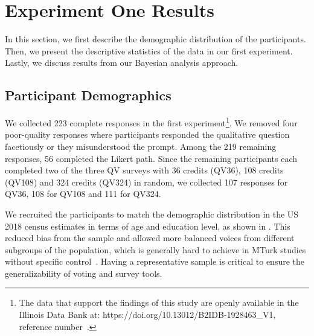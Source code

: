 \section{Experiment One Results} \label{results-1-quan}
In this section, we first describe the demographic distribution of the participants. Then, we present the descriptive statistics of the data in our first experiment. Lastly, we discuss results from our Bayesian analysis approach.

\subsection{Participant Demographics}
We collected 223 complete responses in the first experiment\footnote{The data that support the findings of this study are openly available in the Illinois Data Bank at: https://doi.org/10.13012/B2IDB-1928463\_V1, reference number~\cite{illinoisdatabankIDB_1928463}.}. We removed four poor-quality responses where participants responded the qualitative question facetiously or they misunderstood the prompt. Among the 219 remaining responses, 56 completed the Likert path. Since the remaining participants each completed two of the three QV surveys with 36 credits (QV36), 108 credits (QV108) and 324 credits (QV324) in random, we collected 107 responses for QV36, 108 for QV108 and 111 for QV324. 
{}

We recruited the participants to match the demographic distribution in the US 2018 census estimates in terms of age and education level, as shown in . This reduced bias from the sample and allowed more balanced voices from different subgroups of the population, which is generally hard to achieve in MTurk studies without specific control~\cite{difallah2018demographics}. Having a representative sample is critical to ensure the generalizability of voting and survey tools. 

